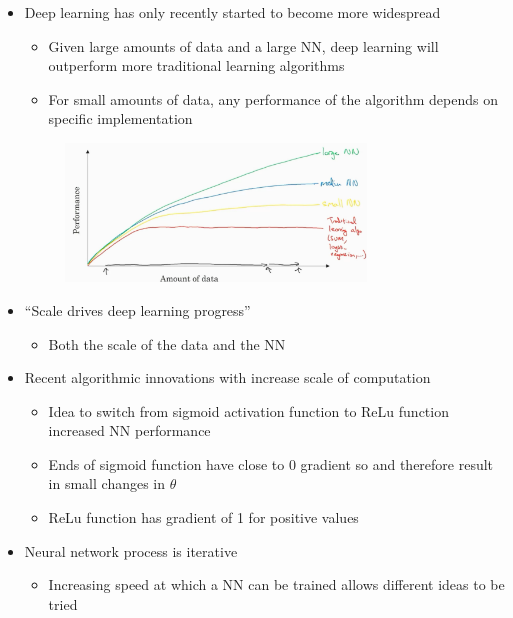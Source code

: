 \documentclass[12pt, letterpaper]{article}
\begin{document}
    \hspace{30mm}
    \begin{itemize}
        \item Deep learning has only recently started to become more widespread
        \begin{itemize}
            \item Given large amounts of data and a large NN, deep learning will outperform more traditional learning algorithms
            \item For small amounts of data, any performance of the algorithm depends on specific implementation
        \end{itemize}
        \begin{figure}[ht]
            \centering
            \includegraphics[width=8cm]{4.png}
        \end{figure}
        \item ``Scale drives deep learning progress''
        \begin{itemize}
            \item Both the scale of the data and the NN
        \end{itemize}
        \item Recent algorithmic innovations with increase scale of computation
        \begin{itemize}
            \item Idea to switch from sigmoid activation function to ReLu function increased NN performance
            \item Ends of sigmoid function have close to 0 gradient so and therefore result in small changes in $\theta$
            \item ReLu function has gradient of 1 for positive values
        \end{itemize}
        \item Neural network process is iterative
        \begin{itemize}
            \item Increasing speed at which a NN can be trained allows different ideas to be tried
        \end{itemize}
    \end{itemize}
\end{document}
